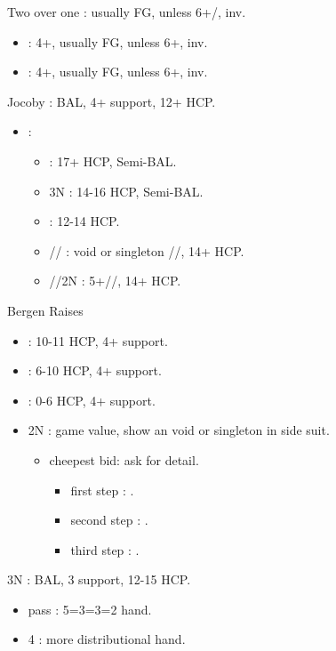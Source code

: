 \documentclass[12pt,twoside,a5paper]{report}%
\begin{document}
	Two over one : usually FG, unless 6+\cl{}/\di{}, inv.
	\begin{itemize}
	\renewcommand{\labelitemi}{}
	\item {} : 4+\cl{}, usually FG, unless 6+\cl{}, inv.
	\item {} : 4+\di{}, usually FG, unless 6+\di{}, inv.
	\end{itemize}

	Jocoby : BAL, 4+\he{} support, 12+ HCP.
	\begin{itemize}
	\renewcommand{\labelitemi}{}
	\item {} :
		\begin{itemize}
		\renewcommand{\labelitemi}{--}
		\item {} : 17+ HCP, Semi-BAL.
		\item 3N : 14-16 HCP, Semi-BAL.
		\item {} : 12-14 HCP.
		\item {}// : void or singleton //, 14+ HCP.
		\item {}//2N : 5+//, 14+ HCP.
		\end{itemize}
	\end{itemize}

	Bergen Raises
	\begin{itemize}
	\renewcommand{\labelitemi}{}
	\item {} : 10-11 HCP, 4+\he{} support.
	\item {} : 6-10 HCP, 4+\he{} support.
	\item {} : 0-6 HCP, 4+\he{} support.
	\item 2N : game value, show an void or singleton in side suit.
		\begin{itemize}
		\renewcommand{\labelitemi}{--}
		\item cheepest bid: ask for detail.
			\begin{itemize}
			\renewcommand{\labelitemi}{--}
				\item first step : \cl{}.
				\item second step : \di{}.
				\item third step : \sp{}.
			\end{itemize}
		\end{itemize}
	\end{itemize}

	3N : BAL, 3\he{} support, 12-15 HCP.
		\begin{itemize}
		\renewcommand{\labelitemi}{--}
		\item pass : 5=3=3=2 hand.
		\item 4\he{} : more distributional hand.
		\end{itemize}
\end{document}
